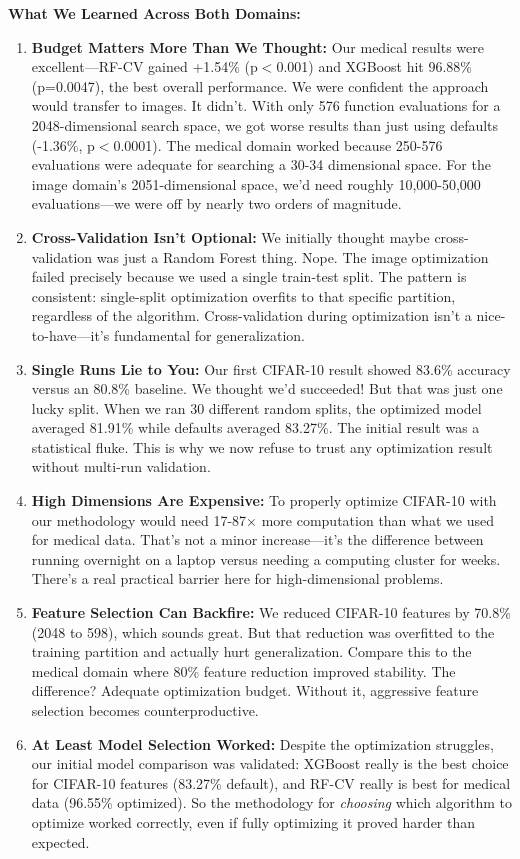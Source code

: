 \documentclass[12pt, a4paper]{article}
\begin{document}
\textbf{What We Learned Across Both Domains:}
\begin{enumerate}
    \item \textbf{Budget Matters More Than We Thought:} Our medical results were excellent—RF-CV gained +1.54\% (p$<$0.001) and XGBoost hit 96.88\% (p=0.0047), the best overall performance. We were confident the approach would transfer to images. It didn't. With only 576 function evaluations for a 2048-dimensional search space, we got worse results than just using defaults (-1.36\%, p$<$0.0001). The medical domain worked because 250-576 evaluations were adequate for searching a 30-34 dimensional space. For the image domain's 2051-dimensional space, we'd need roughly 10,000-50,000 evaluations—we were off by nearly two orders of magnitude.
    
    \item \textbf{Cross-Validation Isn't Optional:} We initially thought maybe cross-validation was just a Random Forest thing. Nope. The image optimization failed precisely because we used a single train-test split. The pattern is consistent: single-split optimization overfits to that specific partition, regardless of the algorithm. Cross-validation during optimization isn't a nice-to-have—it's fundamental for generalization.
    
    \item \textbf{Single Runs Lie to You:} Our first CIFAR-10 result showed 83.6\% accuracy versus an 80.8\% baseline. We thought we'd succeeded! But that was just one lucky split. When we ran 30 different random splits, the optimized model averaged 81.91\% while defaults averaged 83.27\%. The initial result was a statistical fluke. This is why we now refuse to trust any optimization result without multi-run validation.
    
    \item \textbf{High Dimensions Are Expensive:} To properly optimize CIFAR-10 with our methodology would need 17-87× more computation than what we used for medical data. That's not a minor increase—it's the difference between running overnight on a laptop versus needing a computing cluster for weeks. There's a real practical barrier here for high-dimensional problems.
    
    \item \textbf{Feature Selection Can Backfire:} We reduced CIFAR-10 features by 70.8\% (2048 to 598), which sounds great. But that reduction was overfitted to the training partition and actually hurt generalization. Compare this to the medical domain where 80\% feature reduction improved stability. The difference? Adequate optimization budget. Without it, aggressive feature selection becomes counterproductive.
    
    \item \textbf{At Least Model Selection Worked:} Despite the optimization struggles, our initial model comparison was validated: XGBoost really is the best choice for CIFAR-10 features (83.27\% default), and RF-CV really is best for medical data (96.55\% optimized). So the methodology for \emph{choosing} which algorithm to optimize worked correctly, even if fully optimizing it proved harder than expected.
\end{enumerate}
\end{document}

